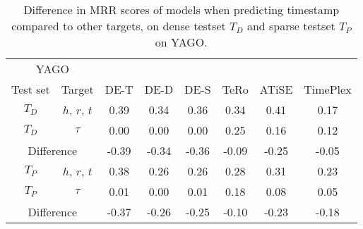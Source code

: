\begin{table}[htb]
\centering
\begin{minipage}{\columnwidthcaption}
\centering
\caption{Difference in MRR scores of models when predicting timestamp compared to other targets, on dense testset $T_D$ and sparse testset $T_P$ on YAGO.}
\label{tab:time_density_timestamp_yago}
\end{minipage}
\vspace{-3mm}

\begin{tabular}{cc|cccccc} \hline
\multicolumn{2}{c|}{YAGO} & & & & & & \\
Test set & Target & DE-T & DE-D & DE-S & TeRo & ATiSE & TimePlex \\ \hline 
$T_D$ & $h$, $r$, $t$ & 
0.39 & 0.34 & 0.36 & 0.34 & 0.41 & 0.17 \\
$T_D$ & $\tau$        & 
0.00 & 0.00 & 0.00 & 0.25 & 0.16 & 0.12 \\ \hline
\multicolumn{2}{c|}{Difference} & 
-0.39 & -0.34 & -0.36 & -0.09 & -0.25 & -0.05 \\ \hline\hline
$T_P$ & $h$, $r$, $t$ & 
0.38 & 0.26 & 0.26 & 0.28 & 0.31 & 0.23 \\
$T_P$ & $\tau$        & 
0.01 & 0.00 & 0.01 & 0.18 & 0.08 & 0.05 \\ \hline 
\multicolumn{2}{c|}{Difference} & 
-0.37 & -0.26 & -0.25 & -0.10 & -0.23 & -0.18 \\ \hline
\end{tabular}

\end{table}

